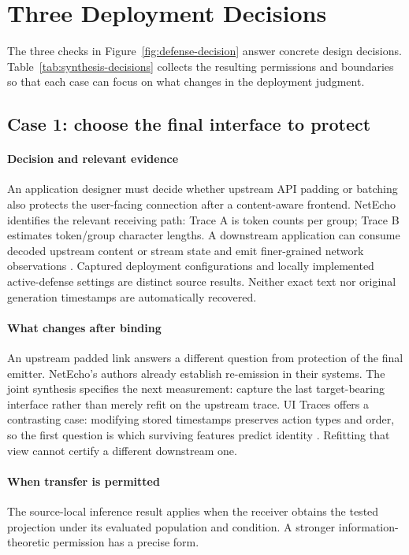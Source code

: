 \section{Three Deployment Decisions}\label{sec:discussion}
The three checks in Figure~\ref{fig:defense-decision} answer concrete design decisions. Table~\ref{tab:synthesis-decisions} collects the resulting permissions and boundaries so that each case can focus on what changes in the deployment judgment.

\subsection{Case 1: choose the final interface to protect}
\paragraph{Decision and relevant evidence}
An application designer must decide whether upstream API padding or batching also protects the user-facing connection after a content-aware frontend. NetEcho identifies the relevant receiving path: Trace A is token counts per group; Trace B estimates token/group character lengths. A downstream application can consume decoded upstream content or stream state and emit finer-grained network observations \cite{netecho2025}. Captured deployment configurations and locally implemented active-defense settings are distinct source results. Neither exact text nor original generation timestamps are automatically recovered.

\paragraph{What changes after binding}
An upstream padded link answers a different question from protection of the final emitter. NetEcho's authors already establish re-emission in their systems. The joint synthesis specifies the next measurement: capture the last target-bearing interface rather than merely refit on the upstream trace. UI Traces offers a contrasting case: modifying stored timestamps preserves action types and order, so the first question is which surviving features predict identity \cite{uitraces2026}. Refitting that view cannot certify a different downstream one.

\paragraph{When transfer is permitted}
The source-local inference result applies when the receiver obtains the tested projection under its evaluated population and condition. A stronger information-theoretic permission has a precise form.

